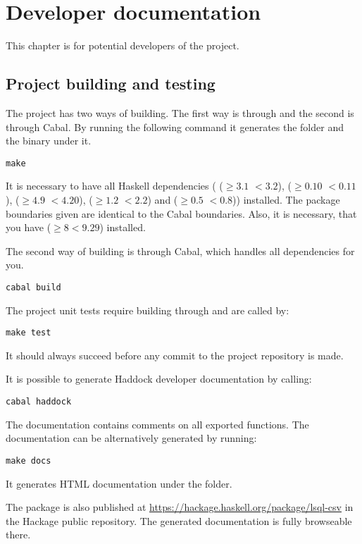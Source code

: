 \chapter{Developer documentation}
This chapter is for potential developers of the project.

\section{Project building and testing}
The project has two ways of building. The first way is through  and the second is through Cabal. 
By running the following command it generates the  folder and the  binary under it.
\begin{verbatim}
make
\end{verbatim}
 
It is necessary to have all Haskell dependencies ( ($\geq 3.1$ $<3.2$),  ($\geq 0.10$ $<0.11$), 
 ($\geq 4.9$ $<4.20$),  ($\geq 1.2$ $<2.2$) and  ($\geq 0.5$ $<0.8$)) installed.
The package boundaries given are identical to the Cabal boundaries. Also, it is necessary, that you have  ($\geq 8 <9.29$) installed.

The second way of building is through Cabal, which handles all dependencies for you.

\begin{verbatim}
cabal build
\end{verbatim}


The project unit tests require building through  and are called by:
\begin{verbatim}
make test
\end{verbatim}
It should always succeed before any commit to the project repository is made.

It is possible to generate Haddock developer documentation by calling:
\begin{verbatim}
cabal haddock
\end{verbatim}

The documentation contains comments on all exported functions. The documentation can be alternatively generated
by running:

\begin{verbatim}
make docs
\end{verbatim}
It generates HTML documentation under the  folder.

The package is also published at \url{https://hackage.haskell.org/package/lsql-csv} in the Hackage public repository. 
The generated documentation is fully browseable there.

